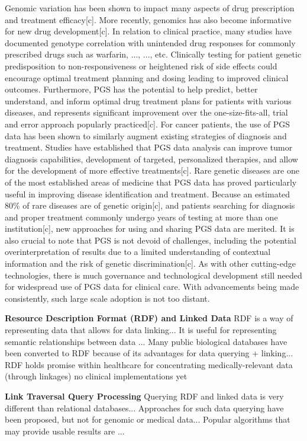 \documentclass{article}
\begin{document}
Genomic variation has been shown to impact many aspects of drug prescription and treatment efficacy[c]. More recently, genomics has also become informative for new drug development[c]. 
In relation to clinical practice, many studies have documented genotype correlation with unintended drug responses for commonly prescribed drugs such as warfarin, ..., ..., etc. 
Clinically testing for patient genetic predisposition to non-responsiveness or heightened risk of side effects could encourage optimal treatment planning and dosing leading to improved clinical outcomes. 
Furthermore, PGS has the potential to help predict, better understand, and inform optimal drug treatment plans for patients with various diseases, and represents significant improvement over the one-size-fits-all, trial and error approach popularly practiced[c]. 
For cancer patients, the use of PGS data has been shown to similarly augment existing strategies of diagnosis and treatment. Studies have established that PGS data analysis can improve tumor diagnosis capabilities, development of targeted, personalized therapies, and allow for the development of more effective treatments[c]. 
Rare genetic diseases are one of the most established areas of medicine that PGS data has proved particularly useful in improving disease identification and treatment. 
Because an estimated 80\% of rare diseases are of genetic origin[c], and patients searching for diagnosis and proper treatment commonly undergo years of testing at more than one institution[c], new approaches for using and sharing PGS data are merited. 
It is also crucial to note that PGS is not devoid of challenges, including the potential overinterpretation of results due to a limited understanding of contextual information and the risk of genetic discrimination[c]. 
As with other cutting-edge technologies, there is much governance and technological development still needed for widespread use of PGS data for clinical care. 
With advancements being made consistently, such large scale adoption is not too distant.

\textbf{Resource Description Format (RDF) and Linked Data}
RDF is a way of representing data that allows for data linking...
It is useful for representing semantic relationships between data ...
Many public biological databases have been converted to RDF because of its advantages for data querying + linking...
RDF holds promise within healthcare for concentrating medically-relevant data (through linkages)
no clinical implementations yet

\textbf{Link Traversal Query Processing}
Querying RDF and linked data is very different than relational databases...
Approaches for such data querying have been proposed, but not for genomic or medical data...
Popular algorithms that may provide usable results are ...
\end{document}

